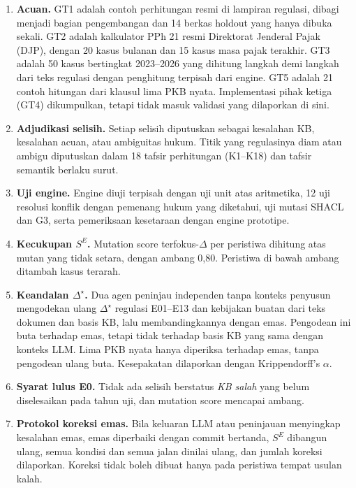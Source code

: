 \documentclass[conference]{IEEEtran}
\makeatletter
\DeclareRobustCommand{\en}[1]{{\usefont{\f@encoding}{\f@family}{\f@series}{it}#1\/}}
\newcommand{\emas}{\star}
\newcommand{\SE}{S^{E}}
\makeatother
\begin{document}
\begin{enumerate}[leftmargin=*,nosep]
  \item \textbf{Acuan.} GT1 adalah contoh perhitungan resmi di lampiran regulasi, dibagi menjadi bagian pengembangan dan 14 berkas \en{holdout} yang hanya dibuka sekali. GT2 adalah kalkulator PPh 21 resmi Direktorat Jenderal Pajak (DJP), dengan 20 kasus bulanan dan 15 kasus masa pajak terakhir. GT3 adalah 50 kasus bertingkat 2023--2026 yang dihitung langkah demi langkah dari teks regulasi dengan penghitung terpisah dari \en{engine}. GT5 adalah 21 contoh hitungan dari klausul lima PKB nyata. Implementasi pihak ketiga (GT4) dikumpulkan, tetapi tidak masuk validasi yang dilaporkan di sini.
  \item \textbf{Adjudikasi selisih.} Setiap selisih diputuskan sebagai kesalahan KB, kesalahan acuan, atau ambiguitas hukum. Titik yang regulasinya diam atau ambigu diputuskan dalam 18 tafsir perhitungan (K1--K18) dan tafsir semantik berlaku surut.
  \item \textbf{Uji \en{engine}.} \en{Engine} diuji terpisah dengan uji unit atas aritmetika, 12 uji resolusi konflik dengan pemenang hukum yang diketahui, uji mutasi SHACL dan G3, serta pemeriksaan kesetaraan dengan \en{engine} prototipe.
  \item \textbf{Kecukupan $\SE$.} \en{Mutation score} terfokus-$\Delta$ per peristiwa dihitung atas mutan yang tidak setara, dengan ambang 0,80. Peristiwa di bawah ambang ditambah kasus terarah.
  \item \textbf{Keandalan $\Delta^{\emas}$.} Dua agen peninjau independen tanpa konteks penyusun mengodekan ulang $\Delta^{\emas}$ regulasi E01--E13 dan kebijakan buatan dari teks dokumen dan basis KB, lalu membandingkannya dengan emas. Pengodean ini buta terhadap emas, tetapi tidak terhadap basis KB yang sama dengan konteks LLM. Lima PKB nyata hanya diperiksa terhadap emas, tanpa pengodean ulang buta. Kesepakatan dilaporkan dengan Krippendorff's $\alpha$.
  \item \textbf{Syarat lulus E0.} Tidak ada selisih berstatus \emph{KB salah} yang belum diselesaikan pada tahun uji, dan \en{mutation score} mencapai ambang.
  \item \textbf{Protokol koreksi emas.} Bila keluaran LLM atau peninjauan menyingkap kesalahan emas, emas diperbaiki dengan \en{commit} bertanda, $\SE$ dibangun ulang, semua kondisi dan semua jalan dinilai ulang, dan jumlah koreksi dilaporkan. Koreksi tidak boleh dibuat hanya pada peristiwa tempat usulan kalah.
\end{enumerate}
\end{document}
